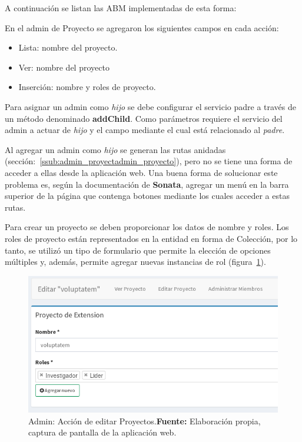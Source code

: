 A continuación se listan las ABM implementadas de esta forma:

\begin{itemize}
        
\end{itemize}



En el admin de Proyecto se agregaron los siguientes campos en cada acción:

\begin{itemize}
    \item Lista: nombre del proyecto.
    \item Ver: nombre del proyecto
    \item Inserción: nombre y roles de proyecto.
\end{itemize}

Para asignar un admin como \textit{hijo} se debe configurar el servicio padre a través de un método denominado \textbf{addChild}. Como parámetros requiere el servicio
del admin a actuar de \textit{hijo} y el campo mediante el cual está relacionado al \textit{padre}.


Al agregar un admin como \textit{hijo} se generan las rutas anidadas (sección:~\ref{ssub:admin_proyectadmin_proyecto}), pero no se tiene una forma de acceder a
ellas desde la aplicación web\@. Una buena forma de solucionar este problema es, según la documentación de \textbf{Sonata}, agregar un menú en la barra superior
de la página que contenga botones mediante los cuales acceder a estas rutas.\parencite{sonata-childAdmin}


Para crear un proyecto se deben proporcionar los datos de nombre y roles. Los roles de proyecto están representados en la entidad en forma de Colección,
por lo tanto, se utilizó un tipo de formulario que permite la elección de opciones múltiples y, además, permite agregar nuevas instancias de
rol (figura~\ref{fig:image/proyecto-editar}).

\begin{figure}[H]
    \includegraphics[width=1\linewidth]{image/edit-proyecto.png}
    \caption[Admin: Acción de  editar Proyectos]{Admin: Acción de  editar Proyectos.\newline \textbf{Fuente:} Elaboración propia, captura de pantalla de la aplicación web.}
    \label{fig:image/proyecto-editar}
\end{figure}
\newpage
{}%

